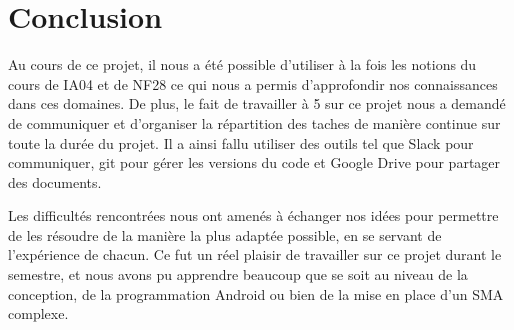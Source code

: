 \documentclass[a4paper,11pt]{article}
\begin{document}



\newpage
\section{Conclusion}
Au cours de ce projet, il nous a été possible d'utiliser à la fois les notions du cours de IA04 et de NF28 ce qui nous a permis d'approfondir nos connaissances dans ces domaines.
De plus, le fait de travailler à 5 sur ce projet nous a demandé de communiquer et d'organiser la répartition des taches de manière continue sur toute la durée du projet. Il a ainsi fallu utiliser des outils tel que Slack pour communiquer, git pour gérer les versions du code et Google Drive pour partager des documents.

Les difficultés rencontrées nous ont amenés à échanger nos idées pour permettre de les résoudre de la manière la plus adaptée possible, en se servant de l'expérience de chacun.
Ce fut un réel plaisir de travailler sur ce projet durant le semestre, et nous avons pu apprendre beaucoup que se soit au niveau de la conception, de la programmation Android ou bien de la mise en place d'un SMA complexe.
\end{document}
